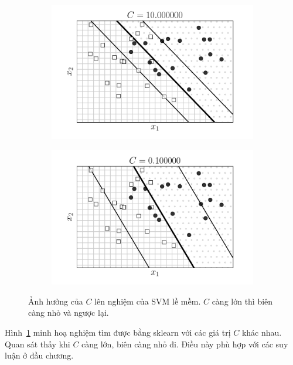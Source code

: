 \begin{figure}[t]
\begin{subfigure}{0.45\textwidth}
\includegraphics[width=0.95\linewidth]{ebookML_src/src/softmargin_svm/ssvm5_10.pdf}
\end{subfigure}
\begin{subfigure}{0.45\textwidth}
\includegraphics[width=0.95\linewidth]{ebookML_src/src/softmargin_svm/ssvm5_01.pdf}
\end{subfigure}
\caption{
Ảnh hưởng của \(C\) lên nghiệm của SVM lề mềm. $C$ càng lớn thì biên
càng nhỏ và ngược lại.
}
\label{fig:20_6}
\end{figure}

Hình~\ref{fig:20_6} minh hoạ nghiệm tìm được bằng sklearn với các giá trị $C$
khác nhau. Quan sát thấy khi $C$ càng lớn, biên càng nhỏ đi. Điều này phù hợp
với các suy luận ở đầu chương.


